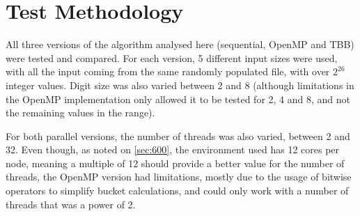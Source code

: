 \section{Test Methodology}
\label{sec:700}

All three versions of the algorithm analysed here (sequential, OpenMP and TBB) were tested and compared. For each version, 5 different input sizes were used, with all the input coming from the same randomly populated file, with over $2^26$ integer values. Digit size was also varied between 2 and 8 (although limitations in the OpenMP implementation only allowed it to be tested for 2, 4 and 8, and not the remaining values in the range).

For both parallel versions, the number of threads was also varied, between 2 and 32. Even though, as noted on \cref{sec:600}, the environment used has 12 cores per node, meaning a multiple of 12 should provide a better value for the number of threads, the OpenMP version had limitations, mostly due to the usage of bitwise operators to simplify bucket calculations, and could only work with a number of threads that was a power of 2.